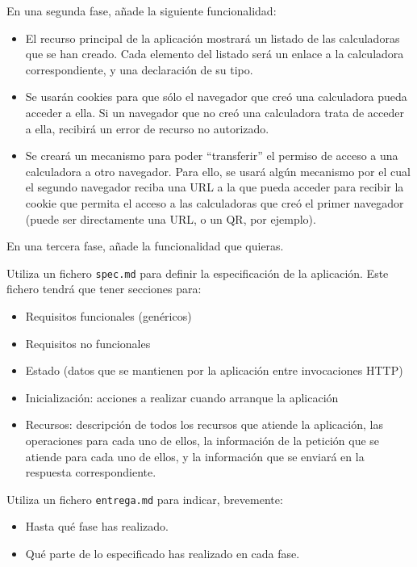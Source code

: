 En una segunda fase, añade la siguiente funcionalidad:

\begin{itemize}
\item El recurso principal de la aplicación mostrará un listado de las calculadoras que se han creado. Cada elemento del listado será un enlace a la calculadora correspondiente, y una declaración de su tipo.
\item Se usarán cookies para que sólo el navegador que creó una calculadora pueda acceder a ella. Si un navegador que no creó una calculadora trata de acceder a ella, recibirá un error de recurso no autorizado.
\item Se creará un mecanismo para poder ``transferir'' el permiso de acceso a una calculadora a otro navegador. Para ello, se usará algún mecanismo por el cual el segundo navegador reciba una URL a la que pueda acceder para recibir la cookie que permita el acceso a las calculadoras que creó el primer navegador (puede ser directamente una URL, o un QR, por ejemplo).
\end{itemize}

En una tercera fase, añade la funcionalidad que quieras.

Utiliza un fichero \texttt{spec.md} para definir la especificación de la aplicación. Este fichero tendrá que tener secciones para:

\begin{itemize}
\item Requisitos funcionales (genéricos)
\item Requisitos no funcionales
\item Estado (datos que se mantienen por la aplicación entre invocaciones HTTP)
\item Inicialización: acciones a realizar cuando arranque la aplicación
\item Recursos: descripción de todos los recursos que atiende la aplicación, las operaciones para cada uno de ellos, la información de la petición que se atiende para cada uno de ellos, y la información que se enviará en la respuesta correspondiente. 
\end{itemize}

Utiliza un fichero \texttt{entrega.md} para indicar, brevemente:

\begin{itemize}
\item Hasta qué fase has realizado.
\item Qué parte de lo especificado has realizado en cada fase.
\end{itemize}

